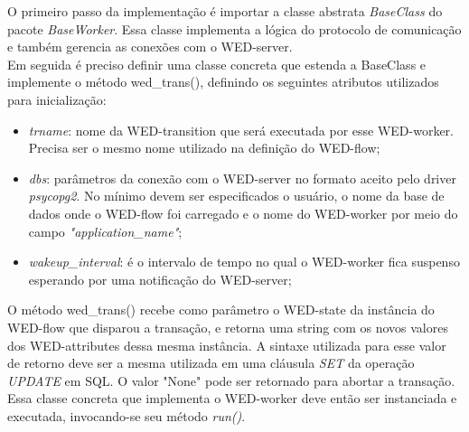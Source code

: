 \documentclass[conference]{IEEEtran}
\begin{document}
O primeiro passo da implementação é importar a classe abstrata \emph{BaseClass} do pacote \emph{BaseWorker}. Essa classe 
implementa a lógica do protocolo de comunicação e também gerencia as conexões com o WED-server. 
\\
\indent  Em seguida é preciso definir uma classe concreta que estenda a BaseClass e implemente o método wed\_trans(),
definindo os seguintes atributos utilizados para inicialização:
\begin{itemize}
\item \emph{trname}: nome da WED-transition que será executada por esse WED-worker. Precisa ser o mesmo nome utilizado na definição
           do WED-flow;
\item \emph{dbs}: parâmetros da conexão com o WED-server no formato aceito pelo driver \emph{psycopg2}. No mínimo devem ser especificados
        o usuário, o nome da base de dados onde o WED-flow foi carregado e o nome do WED-worker por meio do campo \emph{"application\_name"};
\item \emph{wakeup\_interval}: é o intervalo de tempo no qual o WED-worker fica suspenso esperando por uma notificação do WED-server;
\end{itemize}
  O método wed\_trans() recebe como parâmetro o WED-state da instância do WED-flow que disparou a transação, e retorna uma 
string com os novos valores dos WED-attributes dessa mesma instância. A sintaxe utilizada para esse valor de retorno deve
ser a mesma utilizada em uma cláusula \emph{SET} da operação \emph{UPDATE} em SQL. O valor "None" pode ser retornado para abortar
a transação. Essa classe concreta que implementa o WED-worker deve então ser instanciada e executada, invocando-se seu método \emph{run()}.
\end{document}

